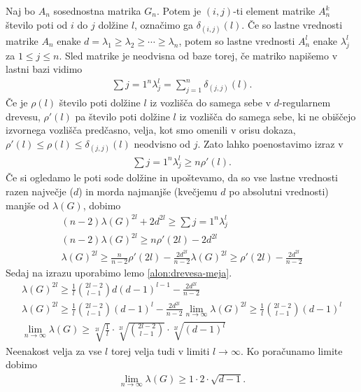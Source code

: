 \begin{dokaz}
    Naj bo \(A_n\) sosednostna matrika \(G_n\). Potem je \((i,j)\)-ti element matrike \(A_n^k\) število poti od \(i\) do \(j\) dolžine \(l\), označimo ga \(\delta_{(i,j)}(l)\). Če so lastne vrednosti matrike \(A_n\) enake \(d=\lambda_1\geq \lambda_2 \geq \cdots \geq \lambda_n\), potem so lastne vrednosti \(A_n^l\) enake \(\lambda_j^l\) za \(1\leq j \leq n\). Sled matrike je neodvisna od baze torej, če matriko napišemo v lastni bazi vidimo
    \begin{align*}
        \sum{j=1}^n \lambda_j^l = \sum_{j=1}^n \delta_{(j, j)}(l).
    \end{align*}
    Če je \(\rho(l)\) število poti dolžine \(l\) iz vozlišča do samega sebe v \(d\)-regularnem drevesu, \(\rho'(l)\) pa število poti dolžine \(l\) iz vozlišča do samega sebe, ki ne obiščejo izvornega vozlišča predčasno, velja, kot smo omenili v orisu dokaza, \(\rho'(l) \leq \rho(l)\leq \delta_{(j,j)}(l)\) neodvisno od \(j\). Zato lahko poenostavimo izraz v
    \begin{align*}
        \sum{j=1}^n \lambda_j^l \geq n \rho'(l).
    \end{align*}
    Če si ogledamo le poti sode dolžine in upoštevamo, da so vse lastne vrednosti razen največje (\(d\)) in morda najmanjše (kvečjemu \(d\) po absolutni vrednosti) manjše od \(\lambda(G)\), dobimo
    \begin{align*}
        (n-2)\lambda(G)^{2l} + 2d^{2l} \geq \sum{j=1}^n \lambda_j^l \\
        (n-2)\lambda(G)^{2l} \geq n\rho'(2l) - 2d^{2l}\\
        \lambda(G)^{2l} \geq \frac{n}{n-2}\rho'(2l) - \frac{2d^{2l}}{n-2}
        \lambda(G)^{2l} \geq \rho'(2l) - \frac{2d^{2l}}{n-2}
    \end{align*}
    Sedaj na izrazu uporabimo lemo \ref{alon:drevesa-meja}.
    \begin{align*}
        \lambda(G)^{2l} \geq \frac{1}{l}\binom{2l-2}{l-1}d(d-1)^{l-1} - \frac{2d^{2l}}{n-2} \\
        \lambda(G)^{2l} \geq \frac{1}{l}\binom{2l-2}{l-1}(d-1)^{l} - \frac{2d^{2l}}{n-2}
        \lim_{n\to\infty} \lambda(G)^{2l} \geq \frac{1}{l}\binom{2l-2}{l-1}(d-1)^{l}\\
        \lim_{n\to\infty} \lambda(G) \geq \sqrt[2l]{\frac{1}{l}}\cdot \sqrt[2l]{\binom{2l-2}{l-1}}\cdot \sqrt[2l]{(d-1)^{l}}
    \end{align*}
    Neenakost velja za vse \(l\) torej velja tudi v limiti \(l\to\infty\). Ko poračunamo limite\cite{polatajko} dobimo
    \begin{align*}
        \lim_{n\to\infty} \lambda(G) \geq 1 \cdot 2 \cdot \sqrt{d-1}.
    \end{align*}
\end{dokaz}
